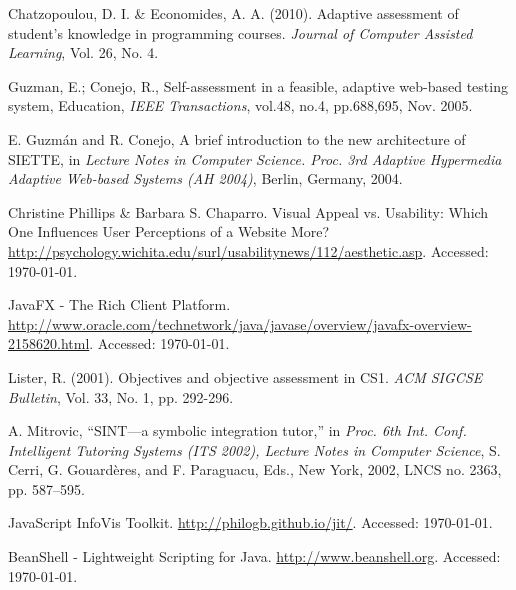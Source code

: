 \begin{thebibliography}{9}
 Chatzopoulou, D. I. \& Economides, A. A. (2010). Adaptive assessment of student's knowledge in programming courses. \textit{Journal of Computer Assisted Learning}, Vol. 26, No. 4.

 Guzman, E.; Conejo, R., Self-assessment in a feasible, adaptive web-based testing system, Education, \textit{IEEE Transactions}, vol.48, no.4, pp.688,695, Nov. 2005.

 E. Guzmán and R. Conejo, A brief introduction to the new architecture of SIETTE, in \textit{Lecture Notes in Computer Science. Proc. 3rd Adaptive Hypermedia Adaptive Web-based Systems (AH 2004)}, Berlin, Germany,
2004.

 Christine Phillips \& Barbara S. Chaparro. Visual Appeal vs. Usability: Which One Influences User Perceptions of a Website More? \url{http://psychology.wichita.edu/surl/usabilitynews/112/aesthetic.asp}. Accessed: \today.

 JavaFX - The Rich Client Platform. \url{http://www.oracle.com/technetwork/java/javase/overview/javafx-overview-2158620.html}. Accessed: \today.

 Lister, R. (2001). Objectives and objective assessment in CS1. \textit{ACM SIGCSE Bulletin}, Vol. 33, No. 1, pp. 292-296.

 A. Mitrovic, “SINT—a symbolic integration tutor,” in \textit{Proc. 6th Int. Conf. Intelligent Tutoring Systems (ITS 2002), Lecture Notes in Computer
Science}, S. Cerri, G. Gouardères, and F. Paraguacu, Eds., New York, 2002, LNCS no. 2363, pp. 587–595.

 JavaScript InfoVis Toolkit. \url{http://philogb.github.io/jit/}. Accessed: \today.

 BeanShell - Lightweight Scripting for Java. \url{http://www.beanshell.org}. Accessed: \today.

\end{thebibliography}